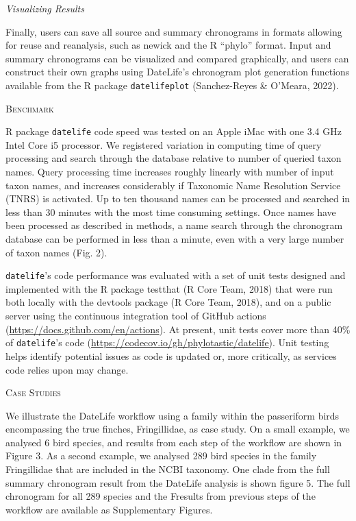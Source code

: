 \documentclass[english,man]{apa6}
\begin{document}
\begin{center}
\emph{Visualizing Results}
\end{center}

Finally, users can save all source and summary chronograms in formats allowing for reuse and reanalysis, such as newick and the R \enquote{phylo} format. Input and summary chronograms can be visualized and compared graphically, and users can construct their own graphs using DateLife's chronogram plot generation functions available from the R package \texttt{datelifeplot} (Sanchez-Reyes \& O'Meara, 2022).

\begin{center}
\textsc{Benchmark}
\end{center}

R package \texttt{datelife} code speed was tested on an Apple iMac
with one 3.4 GHz Intel Core i5 processor.
We registered variation in computing time of query processing and search through the database relative to number of queried taxon names.
Query processing time increases roughly linearly with number of input taxon names, and
increases considerably if Taxonomic Name Resolution Service (TNRS) is activated.
Up to ten thousand names can be processed and searched in less than 30 minutes with the most time consuming settings.
Once names have been processed as described in methods, a name search through the chronogram database can be performed in less than a minute, even with a very large number of taxon names (Fig. 2).

\texttt{datelife}'s code performance was evaluated with a set of unit tests designed and
implemented with the R package testthat (R Core Team, 2018) that were run both locally
with the devtools package (R Core Team, 2018), and on a public server using the continuous integration tool of GitHub actions (\url{https://docs.github.com/en/actions}).
At present, unit tests cover more than 40\% of \texttt{datelife}'s code (\url{https://codecov.io/gh/phylotastic/datelife}).
Unit testing helps identify potential issues as code is updated or, more critically, as services code relies upon may change.

\begin{center}
\textsc{Case Studies}
\end{center}

We illustrate the DateLife workflow using a family within the passeriform birds encompassing the true finches, Fringillidae, as case study. On a small example, we analysed 6 bird species, and results from each step of the workflow are shown in Figure 3. As a second example, we analysed 289 bird species in the family Fringillidae that are included in the NCBI taxonomy. One clade from the full summary chronogram result from the DateLife analysis is shown figure 5. The full chronogram for all 289 species and the Fresults from previous steps of the workflow are available as Supplementary Figures.
\end{document}
